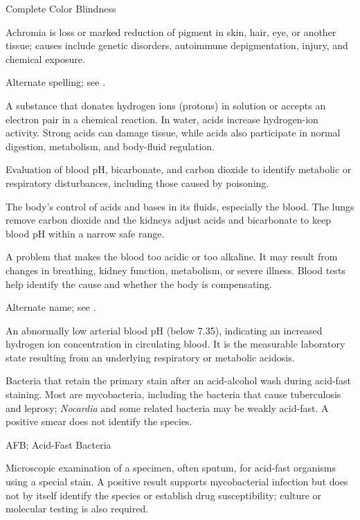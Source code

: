 \synonyms
Complete Color Blindness

 Achromia is loss or marked reduction of pigment in skin, hair, eye, or another tissue; causes include genetic disorders, autoimmune depigmentation, injury, and chemical exposure.

 Alternate spelling; see .

 A substance that donates hydrogen ions (protons) in solution or accepts an electron pair in a chemical reaction. In water, acids increase hydrogen-ion activity. Strong acids can damage tissue, while acids also participate in normal digestion, metabolism, and body-fluid regulation.

 Evaluation of blood pH, bicarbonate, and carbon dioxide to identify metabolic or respiratory disturbances,
including those caused by poisoning.

 The body’s control of acids and bases in its fluids, especially the blood. The lungs remove carbon dioxide and the kidneys adjust acids and bicarbonate to keep blood pH within a narrow safe range.

 A problem that makes the blood too acidic or too alkaline. It may result from changes in breathing, kidney function, metabolism, or severe illness. Blood tests help identify the cause and whether the body is compensating.

 Alternate name; see .

 An abnormally low arterial blood pH (below 7.35), indicating an increased hydrogen ion concentration in circulating blood. It is the measurable laboratory state resulting from an underlying respiratory or metabolic acidosis.

 Bacteria that retain the primary stain after an acid-alcohol wash during acid-fast staining. Most are mycobacteria, including the bacteria that cause tuberculosis and leprosy; \textit{Nocardia} and some related bacteria may be weakly acid-fast. A positive smear does not identify the species.

\synonyms
AFB; Acid-Fast Bacteria

 Microscopic examination of a specimen, often sputum, for acid-fast organisms using a
special stain. A positive result supports mycobacterial infection but does not by itself
identify the species or establish drug susceptibility; culture or molecular testing is
also required.

